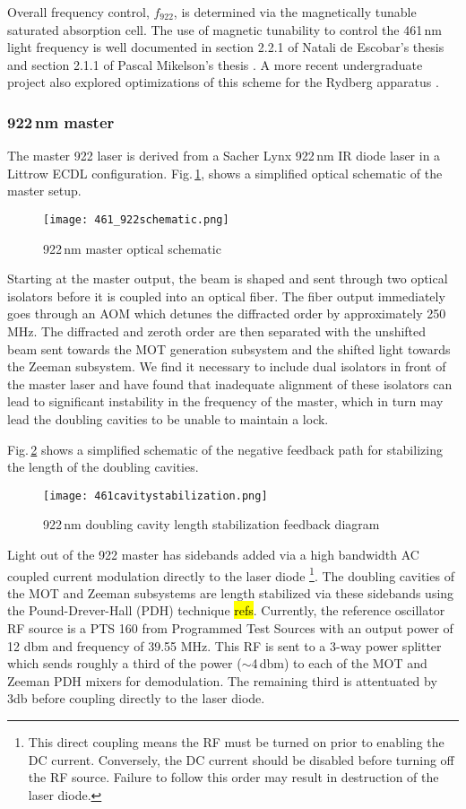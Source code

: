 Overall frequency control, $f_{922}$, is determined via the magnetically tunable saturated absorption cell.
The use of magnetic tunability to control the 461\,nm light frequency is well documented in section 2.2.1 of Natali de Escobar's thesis \cite{MartinezdeEscolar2010} and section 2.1.1 of Pascal Mikelson's thesis \cite{Mickelson2010b}.
A more recent undergraduate project also explored optimizations of this scheme for the Rydberg apparatus \cite{MichaelViray2014}.

\subsubsection{922\,nm master}
The master 922 laser is derived from a Sacher Lynx 922\,nm IR diode laser in a Littrow ECDL configuration.
Fig.\,\ref{fig:922optical}, shows a simplified optical schematic of the master setup.
	\begin{figure}
		\centerline{
		\texttt{[image: 461\_922schematic.png]}}
		\caption{922\,nm master optical schematic}
		\label{fig:922optical}
	\end{figure} 
	
Starting at the master output, the beam is shaped and sent through two optical isolators before it is coupled into an optical fiber.
The fiber output immediately goes through an AOM which detunes the diffracted order by approximately 250 MHz.
The diffracted and zeroth order are then separated with the unshifted beam sent towards the MOT generation subsystem and the shifted light towards the Zeeman subsystem.
We find it necessary to include dual isolators in front of the master laser and have found that inadequate alignment of these isolators can lead to significant instability in the frequency of the master, which in turn may lead the doubling cavities to be unable to maintain a lock.

Fig.\,\ref{fig:461cavityLock} shows a simplified schematic of the negative feedback path for stabilizing the length of the doubling cavities.
	\begin{figure}
		\centerline{
		\texttt{[image: 461cavitystabilization.png]}}
		\caption{922\,nm doubling cavity length stabilization feedback diagram}
		\label{fig:461cavityLock}
	\end{figure}
Light out of the 922 master has sidebands added via a high bandwidth AC coupled current modulation directly to the laser diode 
\footnote{This direct coupling means the RF must be turned on prior to enabling the DC current. 
Conversely, the DC current should be disabled before turning off the RF source. 
Failure to follow this order may result in destruction of the laser diode.}.
The doubling cavities of the MOT and Zeeman subsystems are length stabilized via these sidebands using the Pound-Drever-Hall (PDH) technique \hl{refs}.
Currently, the reference oscillator RF source is a PTS 160 from Programmed Test Sources with an output power of 12 dbm and frequency of 39.55 MHz.
This RF is sent to a 3-way power splitter which sends roughly a third of the power ($\sim$4\,dbm) to each of the MOT and Zeeman PDH mixers for demodulation. 
The remaining third is attentuated by 3db before coupling directly to the laser diode.

